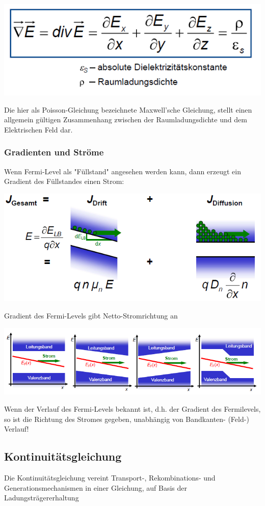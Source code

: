 \begin{center}
	\includegraphics[width=0.5\linewidth]{Kapitel/Kap05/Poissongleichung}
\end{center}
Die hier als Poisson-Gleichung bezeichnete Maxwell'sche Gleichung, stellt einen allgemein gültigen Zusammenhang zwischen der Raumladungsdichte und dem Elektrischen Feld dar.

\subsubsection{Gradienten und Ströme}
Wenn Fermi-Level als "Füllstand" angesehen werden kann, dann erzeugt ein Gradient des Füllstandes einen Strom:

\begin{center}
	\includegraphics[width=0.7\linewidth]{Kapitel/Kap05/Gradient}
\end{center}
Gradient des Fermi-Levels gibt Netto-Stromrichtung an
\begin{center}
	\includegraphics[width=0.6\linewidth]{Kapitel/Kap05/FerminiveauverlaufBeispiele}
\end{center}
Wenn der Verlauf des Fermi-Levels bekannt ist, d.h. der Gradient des Fermilevels, so ist die Richtung des Stromes gegeben, unabhängig von Bandkanten- (Feld-) Verlauf!

\subsection{Kontinuitätsgleichung}
Die Kontinuitätsgleichung vereint  Transport-, Rekombinations- und Generationsmechanismen in einer Gleichung, auf Basis der Ladungsträgererhaltung

